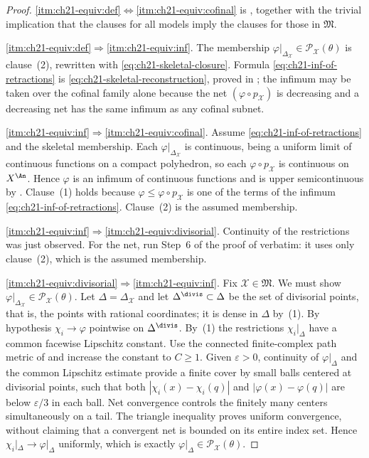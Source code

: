\begin{proof}
\cref{itm:ch21-equiv:def}$\Leftrightarrow$\cref{itm:ch21-equiv:cofinal} is
, together with the trivial
implication that the clauses for all models imply the clauses for those in
$\mathfrak M$.

\cref{itm:ch21-equiv:def}$\Rightarrow$\cref{itm:ch21-equiv:inf}.  The membership
$\varphi|_{\Delta_{\mathcal X}}\in\mathcal P_{\mathcal X}(\theta)$ is
clause~(2), rewritten with \eqref{eq:ch21-skeletal-closure}.  Formula
\eqref{eq:ch21-inf-of-retractions} is
\eqref{eq:ch21-skeletal-reconstruction}, proved in
; the infimum may be taken over the
cofinal family alone because the net $(\varphi\circ p_{\mathcal X})$ is
decreasing and a decreasing net has the same infimum as any cofinal
subnet.

\cref{itm:ch21-equiv:inf}$\Rightarrow$\cref{itm:ch21-equiv:cofinal}.  Assume
\eqref{eq:ch21-inf-of-retractions} and the skeletal membership.  Each
$\varphi|_{\Delta_{\mathcal X}}$ is continuous, being a uniform limit of
continuous functions on a compact polyhedron, so each
$\varphi\circ p_{\mathcal X}$ is continuous on $X^{\An}$.  Hence
$\varphi$ is an infimum of continuous functions and is upper
semicontinuous by .  Clause~(1) holds because
$\varphi\leq\varphi\circ p_{\mathcal X}$ is one of the terms of the
infimum \eqref{eq:ch21-inf-of-retractions}.  Clause~(2) is the assumed
membership.

\cref{itm:ch21-equiv:inf}$\Rightarrow$\cref{itm:ch21-equiv:divisorial}.
Continuity of the restrictions was just observed.  For the net, run Step~6
of the proof of  verbatim: it uses only
clause~(2), which is the assumed membership.

\cref{itm:ch21-equiv:divisorial}$\Rightarrow$\cref{itm:ch21-equiv:inf}.  Fix
$\mathcal X\in\mathfrak M$.  We must show
$\varphi|_{\Delta_{\mathcal X}}\in\mathcal P_{\mathcal X}(\theta)$.  Let
$\Delta=\Delta_{\mathcal X}$ and let $\Delta^{\divis}\subset\Delta$ be
the set of divisorial points, that is, the points with rational
coordinates; it is dense in $\Delta$ by
\,(1).  By hypothesis
$\chi_i\to\varphi$ pointwise on $\Delta^{\divis}$.  By
\,(1) the restrictions
$\chi_i|_\Delta$ have a common facewise Lipschitz constant.  Use the
connected finite-complex path metric of  and
increase the constant to $C\geq1$.  Given $\varepsilon>0$, continuity
of $\varphi|_\Delta$ and the common Lipschitz estimate provide a finite
cover by small balls centered at divisorial points, such that both
$|\chi_i(x)-\chi_i(q)|$ and $|\varphi(x)-\varphi(q)|$ are below
$\varepsilon/3$ in each ball.  Net convergence controls the finitely many
centers simultaneously on a tail.  The triangle inequality proves
uniform convergence, without claiming that a convergent net is bounded
on its entire index set.  Hence
$\chi_i|_\Delta\to\varphi|_\Delta$ uniformly, which is exactly
$\varphi|_\Delta\in\mathcal P_{\mathcal X}(\theta)$.


\end{proof}
